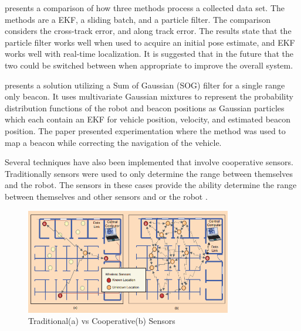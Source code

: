 \documentclass[conference]{IEEEtran}
\begin{document}
	
	
	\cite{Kurth2003} presents a comparison of how three methods process a collected data set. The methods are a EKF, a sliding batch, and a particle filter. The comparison considers the cross-track error, and along track error. The results state that the particle filter works well when used to acquire an initial pose estimate, and EKF works well with real-time localization. It is suggested that in the future that the two could be switched between when appropriate to improve the overall system. 
	
	
	
	
	
	
	
	
	
	
	
	
	
	
	
	\cite{Vallicrosa2015} presents a solution utilizing a Sum of Gaussian (SOG) filter for a single range only beacon. It uses multivariate Gaussian mixtures to represent the probability distribution functions of the robot and beacon positions as Gaussian particles which each contain an EKF for vehicle position, velocity, and estimated beacon position. The paper presented experimentation where the method was used to map a beacon while correcting the navigation of the vehicle. 
	
	
	
	Several techniques have also been implemented that involve cooperative sensors. Traditionally sensors were used to only determine the range between themselves and the robot. The sensors in these cases provide the ability determine the range between themselves and other sensors and or the robot \cite{Patwari2005}.
	
	\begin{figure}[h!]
		
		\centering
		
		\includegraphics[width=90mm]{coop_loc_comp_patwari.png}
		
		\caption{Traditional(a) vs Cooperative(b) Sensors \cite{Patwari2005}}
		
		\label{trad_vs_coop_sensors}
		
	\end{figure}
	
\end{document}
